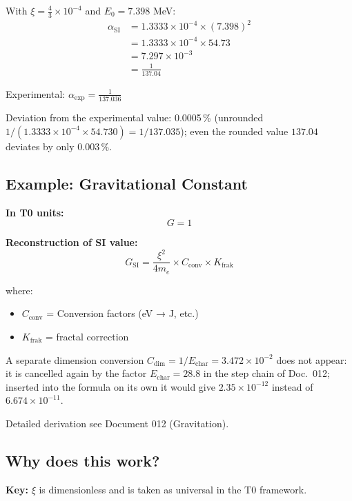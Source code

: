 	With $\xi = \frac{4}{3} \times 10^{-4}$ and $E_0 = 7.398$ MeV:
	\begin{align}
		\alpha_{\text{SI}} &= 1.3333 \times 10^{-4} \times (7.398)^2 \\
		&= 1.3333 \times 10^{-4} \times 54.73 \\
		&= 7.297 \times 10^{-3} \\
		&= \frac{1}{137.04}
	\end{align}
	
	Experimental: $\alpha_{\text{exp}} = \frac{1}{137.036}$
	
	Deviation from the experimental value: 0.0005\,\% (unrounded $1/(1.3333\times10^{-4}\times54.730) = 1/137.035$); even the rounded value $137.04$ deviates by only $0.003\,\%$.
	
	\subsection{Example: Gravitational Constant}
	
	\textbf{In T0 units:}
	\begin{equation}
		G = 1
	\end{equation}
	
	\textbf{Reconstruction of SI value:}
	\begin{equation}
		G_{\text{SI}} = \frac{\xi^2}{4m_e} \times C_{\text{conv}} \times K_{\text{frak}}
	\end{equation}
	
	where:
	\begin{itemize}
		\item $C_{\text{conv}}$ = Conversion factors (eV → J, etc.)
		\item $K_{\text{frak}}$ = fractal correction
	\end{itemize}
	
	A separate dimension conversion $C_{\text{dim}} = 1/E_{\text{char}} = 3.472\times10^{-2}$ does not appear: it is cancelled again by the factor $E_{\text{char}} = 28.8$ in the step chain of Doc.~012; inserted into the formula on its own it would give $2.35\times10^{-12}$ instead of $6.674\times10^{-11}$.
	
	Detailed derivation see Document 012 (Gravitation).
	
	\subsection{Why does this work?}
	
	\textbf{Key:} $\xi$ is dimensionless and is taken as universal in the T0 framework.
	
